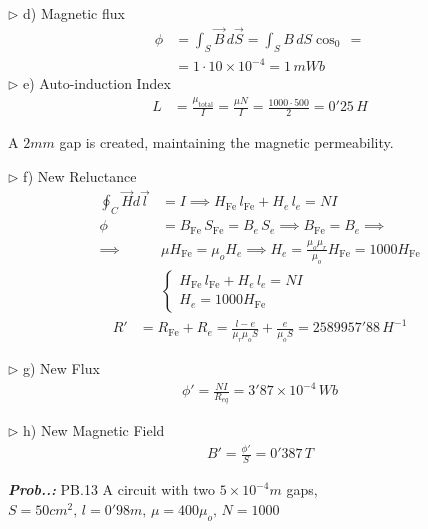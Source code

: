 \documentclass[a4paper]{article}
\begin{document}
$\triangleright$ d) Magnetic flux
\begin{align}
\phi&=\int _{S} \vec{B}\,d\vec{S}=\int _{S}B\,dS\cos_{0}\, = \\
&=1\cdot 10 \times 10^{-4}=\boxed{ 1\, mWb}
\end{align}
$\triangleright$ e) Auto-induction Index
\begin{align}
L&=\frac{\mu_{\text{total}}}{I}=\frac{\mu N}{I}=\frac{1000\cdot 500}{2}=\boxed{0'25\,H}
\end{align}

A $2mm$ gap is created, maintaining the magnetic permeability.

$\triangleright$ f) New Reluctance
\begin{align}
\oint_{C}\vec{H}d\vec{l}&=I\implies H_{\text{Fe}}\,l_{\text{Fe}}+H_{e}\,l_{e}=NI \\
\phi&=B_{\text{Fe}}\, S_{\text{Fe}}=B_{e}\,S_{e} \implies B_{\text{Fe}}=B_{e} \implies \\
\implies&\mu H_{\text{Fe}}=\mu_{o}H_{e}\implies H_{e}=\frac{\mu_{o}\mu_{r}}{\mu_{o}}H_{\text{Fe}}=1000H_{\text{Fe}} \\
&\begin{cases}
H_{\text{Fe}}\,l_{\text{Fe}}+H_{e}\,l_{e}=NI \\
H_{e}=1000H_{\text{Fe}}
\end{cases}
\end{align}
\begin{align}
R'&=R_{\text{Fe}}+R_{e}=\frac{l-e}{\mu_{r}\mu_{o}S}+\frac{e}{\mu _{o}S}=\boxed{2589957'88\,H^{-1}}
\end{align}

$\triangleright$ g) New Flux
\begin{align}
\phi '=\frac{NI}{R_{eq}}=\boxed{3'87\times 10^{-4}\,Wb}
\end{align}

$\triangleright$ h) New Magnetic Field
\begin{align}
B'=\frac{\phi'}{S}=\boxed{0'387\,T}
\end{align}

\vspace{2ex}\textbf{\textit{Prob.\thesection.\theprob: }}PB.13 A circuit with two $5\times 10^{-4}m$ gaps, $S=50cm^{2},\,l=0'98m,\,\mu=400\mu_{o},\,N=1000$ 
\end{document}
